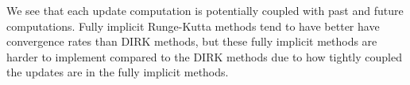 We see that each update computation is potentially coupled with past and future computations.
Fully implicit Runge-Kutta methods tend to have better have convergence rates than DIRK methods, but these fully implicit methods are harder to implement compared to the DIRK methods due to how tightly coupled the updates are in the fully implicit methods. 